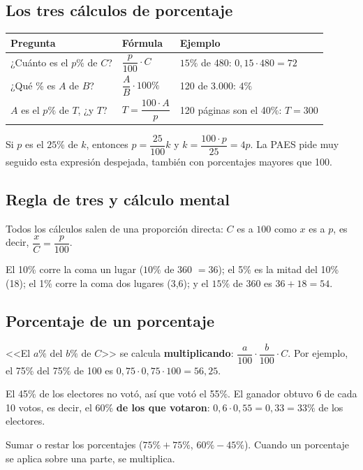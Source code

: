 \subsection{Los tres cálculos de porcentaje}
\begin{center}
\renewcommand{\arraystretch}{1.5}
\begin{tabular}{lll}
\toprule Pregunta & Fórmula & Ejemplo\\ \midrule
¿Cuánto es el $p\%$ de $C$? & $\dfrac{p}{100}\cdot C$ & $15\%$ de 480: $0{,}15\cdot 480 = 72$\\
¿Qué \% es $A$ de $B$? & $\dfrac{A}{B}\cdot 100\%$ & 120 de 3.000: $4\%$\\
$A$ es el $p\%$ de $T$, ¿y $T$? & $T = \dfrac{100\cdot A}{p}$ & 120 páginas son el 40\%: $T = 300$\\ \bottomrule
\end{tabular}
\end{center}
\begin{ojo} Si $p$ es el $25\%$ de $k$, entonces $p = \dfrac{25}{100}k$ y $k = \dfrac{100\cdot p}{25} = 4p$. La PAES pide muy seguido esta expresión despejada, también con porcentajes mayores que 100.\end{ojo}

\subsection{Regla de tres y cálculo mental}
Todos los cálculos salen de una proporción directa: $C$ es a $100$ como $x$ es a $p$, es decir, $\dfrac{x}{C} = \dfrac{p}{100}$.
\begin{clave} El 10\% corre la coma un lugar ($10\%$ de 360 $= 36$); el 5\% es la mitad del 10\% (18); el 1\% corre la coma dos lugares (3,6); y el $15\%$ de 360 es $36 + 18 = 54$.\end{clave}

\subsection{Porcentaje de un porcentaje}
<<El $a\%$ del $b\%$ de $C$>> se calcula \textbf{multiplicando}: $\dfrac{a}{100}\cdot\dfrac{b}{100}\cdot C$. Por ejemplo, el 75\% del 75\% de 100 es $0{,}75\cdot 0{,}75\cdot 100 = 56{,}25$.
\begin{ejemplo}[Votación] El 45\% de los electores no votó, así que votó el 55\%. El ganador obtuvo 6 de cada 10 votos, es decir, el 60\% \textbf{de los que votaron}: $0{,}6\cdot 0{,}55 = 0{,}33 = 33\%$ de los electores.\end{ejemplo}
\begin{ojo} Sumar o restar los porcentajes ($75\% + 75\%$, $60\% - 45\%$). Cuando un porcentaje se aplica sobre una parte, se multiplica.\end{ojo}

